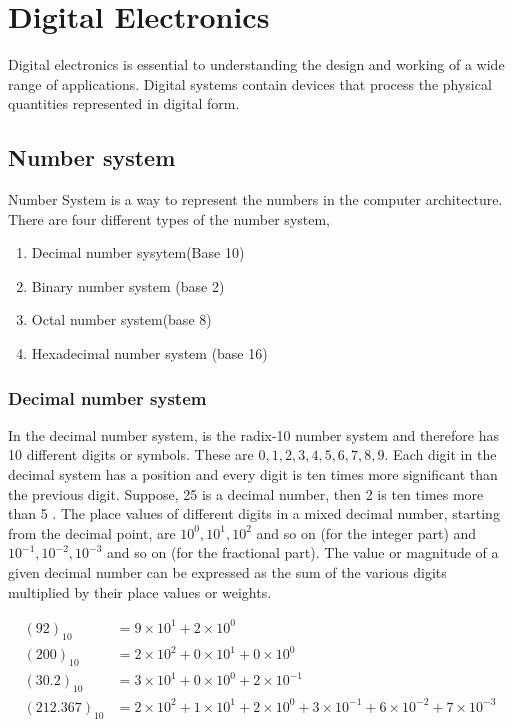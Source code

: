 \chapter{Digital Electronics}
Digital electronics is essential to understanding the design and working of a wide range of applications. Digital systems contain devices that process the physical
quantities represented in digital form.
\section{Number system}
Number System is a way to represent the numbers in the computer architecture. There are four different types of the number system, 
\begin{enumerate}
	\item Decimal number sysytem(Base 10)
	\item Binary number system (base 2)
	\item Octal number system(base 8)
	\item Hexadecimal number system (base 16)
\end{enumerate}

\subsection{Decimal number system}
In the decimal number system, is the radix-10 number system and therefore has 10 different digits or symbols. These are $0,1,2,3,4,5,6,7,8,9$. Each digit in the decimal system has a position and every digit is ten times more significant than the previous digit. Suppose, 25 is a decimal number, then 2 is ten times more than 5 . 
The place values of different digits in a mixed decimal number, starting from the decimal point, are $10^{0}, 10^{1}, 10^{2}$ and so on (for the integer part) and $10^{-1}, 10^{-2}, 10^{-3}$ and so on (for the fractional part). The value or magnitude of a given decimal number can be expressed as the sum of the various digits multiplied by their place values or weights.
\begin{example}
	\begin{align*}
	(92)_{10}&=9 \times 10^{1}+2 \times 10^{0} \\
	(200)_{10}&=2 \times 10^{2}+0 \times 10^{1}+0 \times 10^{0}\\
	(30.2)_{10}&=3 \times 10^{1}+0 \times 10^{0}+2 \times 10^{-1} \\
	(212.367)_{10}&=2 \times 10^{2}+1 \times 10^{1}+2 \times 10^{0}+3 \times 10^{-1}+6 \times 10^{-2}+7 \times 10^{-3}
	\end{align*}
\end{example}

